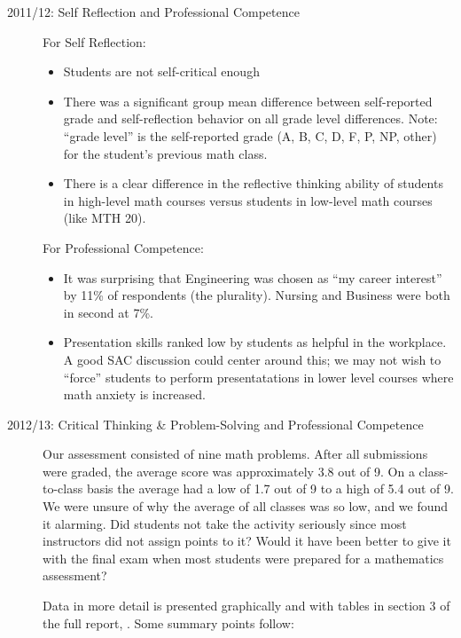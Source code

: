 \begin{description}

\item[2011/12: Self Reflection and Professional Competence]
For Self Reflection: 
\begin{itemize}
\item Students are not self-critical enough
\item There was a significant group mean difference between self-reported grade
  and self-reflection behavior on all grade level differences.  Note: ``grade
  level'' is the self-reported grade (A, B, C, D, F, P, NP, other) for the
  student's previous math class.
\item There is a clear difference in the reflective thinking ability of students
  in high-level math courses versus students in low-level math courses (like MTH
  20).
\end{itemize}
For Professional Competence:
\begin{itemize}
\item It was surprising that Engineering was chosen as ``my career interest'' by
  11\% of respondents (the plurality). Nursing and Business were both in second
  at 7\%.\
\item Presentation skills ranked low by students as helpful in the workplace.
  A good SAC discussion could center around this; we may not
  wish to ``force'' students to perform presentatations in lower level courses where math
  anxiety is increased.
\end{itemize}

\item[2012/13:  Critical Thinking \& Problem-Solving and Professional Competence]

Our assessment consisted of nine math problems.  After all submissions were
graded, the average score was approximately 3.8 out of 9.  On a class-to-class
basis the average had a low of 1.7 out of 9 to a high of 5.4 out of 9.  We were
unsure of why the average of all classes was so low, and we found it alarming.
Did students not take the activity seriously since most instructors did not
assign points to it?  Would it have been better to give it with the final exam
when most students were prepared for a mathematics assessment? 

Data in more detail is presented graphically and with tables in section 3 of the
full report, \cite{annualLASreport2012}. Some summary points follow:


\end{description}
